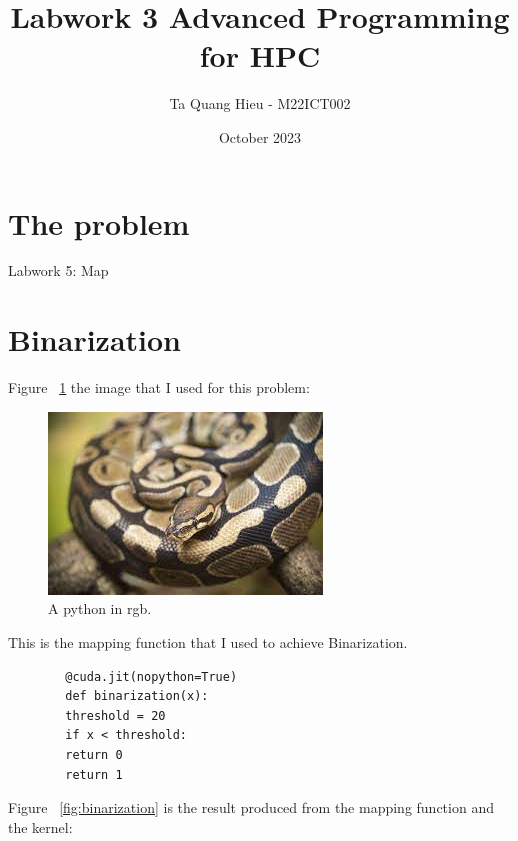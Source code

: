 \documentclass{article}
\title{Labwork 3 Advanced Programming for HPC}
\author{Ta Quang Hieu - M22ICT002}
\date{October 2023}
\begin{document}
	
	\maketitle
	
	\section{The problem}
	Labwork 5: Map
	
	\section{Binarization}
	Figure ~\ref{fig:python} the image that I used for this problem:
	
	\begin{figure}
		\includegraphics[width=\linewidth]{python.jpg}
		\caption{A python in rgb.}
		\label{fig:python}
	\end{figure}
	
	This is the mapping function that I used to achieve Binarization.
	
	\begin{verbatim}
		@cuda.jit(nopython=True)
		def binarization(x):
		threshold = 20
		if x < threshold:
		return 0
		return 1
	\end{verbatim}
	
	Figure ~\ref{fig:binarization} is the result produced from the mapping function and the kernel:
	
\end{document}
